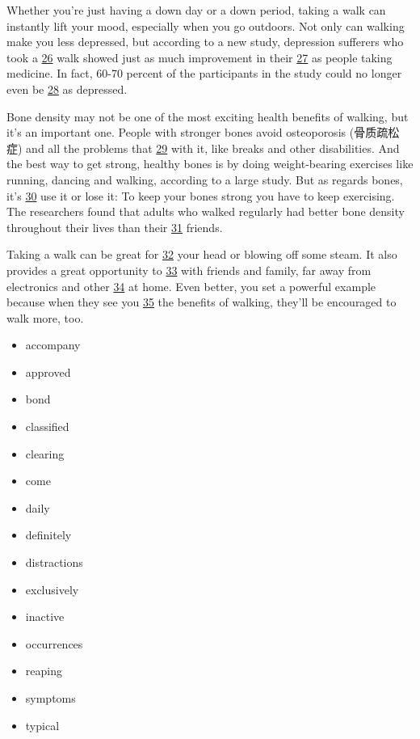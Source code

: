 \documentclass[UTF8,11pt]{ctexart}
\begin{document}
Whether you’re just having a down day or a down period, taking a walk can instantly lift your mood, especially when you go outdoors. Not only can walking make you less depressed, but according to a new study, depression sufferers who took a \uline{26} walk showed just as much improvement in their \uline{27} as people taking medicine. In fact, 60-70 percent of the participants in the study could no longer even be \uline{28} as depressed.


Bone density may not be one of the most exciting health benefits of walking, but it’s an important one. People with stronger bones avoid osteoporosis (骨质疏松症) and all the problems that \uline{29} with it, like breaks and other disabilities. And the best way to get strong, healthy bones is by doing weight-bearing exercises like running, dancing and walking, according to a large study. But as regards bones, it’s \uline{30} use it or lose it: To keep your bones strong you have to keep exercising. The researchers found that adults who walked regularly had better bone density throughout their lives than their \uline{31} friends.


Taking a walk can be great for \uline{32} your head or blowing off some steam. It also provides a great opportunity to \uline{33} with friends and family, far away from electronics and other \uline{34} at home. Even better, you set a powerful example because when they see you \uline{35} the benefits of walking, they’ll be encouraged to walk more, too.


\begin{itemize}[leftmargin=2em,itemsep=.2em,topsep=.4em]\item[A.] accompany
\item[B.] approved
\item[C.] bond
\item[D.] classified
\item[E.] clearing
\item[F.] come
\item[G.] daily
\item[H.] definitely
\item[I.] distractions
\item[J.] exclusively
\item[K.] inactive
\item[L.] occurrences
\item[M.] reaping
\item[N.] symptoms
\item[O.] typical
\end{itemize}
\end{document}
